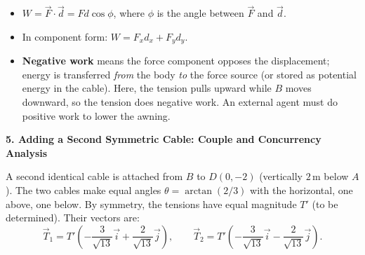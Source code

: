 \documentclass[11pt]{article}
\begin{document}
\begin{aretenir}
\begin{itemize}
\item $W = \vec{F} \cdot \vec{d} = F d \cos\phi$, where $\phi$ is the angle between $\vec{F}$ and $\vec{d}$.
\item In component form: $W = F_x d_x + F_y d_y$.
\item \textbf{Negative work} means the force component opposes the displacement; energy is transferred \emph{from} the body \emph{to} the force source (or stored as potential energy in the cable). Here, the tension pulls upward while $B$ moves downward, so the tension does negative work. An external agent must do positive work to lower the awning.
\end{itemize}
\end{aretenir}

\textbf{5. Adding a Second Symmetric Cable: Couple and Concurrency Analysis}\par
A second identical cable is attached from $B$ to $D(0,-2)$ (vertically $2\,\mathrm{m}$ below $A$). The two cables make equal angles $\theta = \arctan(2/3)$ with the horizontal, one above, one below. By symmetry, the tensions have equal magnitude $T'$ (to be determined). Their vectors are:
\[
\vec{T}_1 = T'\left(-\frac{3}{\sqrt{13}}\vec{i} + \frac{2}{\sqrt{13}}\vec{j}\right),\qquad
\vec{T}_2 = T'\left(-\frac{3}{\sqrt{13}}\vec{i} - \frac{2}{\sqrt{13}}\vec{j}\right).
\]
\end{document}
